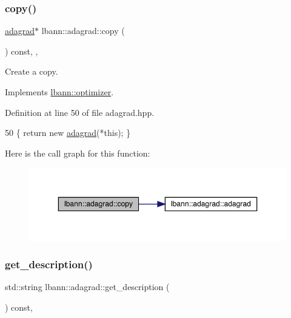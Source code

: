 \subsubsection{\texorpdfstring{copy()}{copy()}}
{\footnotesize\ttfamily \hyperlink{classlbann_1_1adagrad}{adagrad}$\ast$ lbann\+::adagrad\+::copy (\begin{DoxyParamCaption}{ }\end{DoxyParamCaption}) const\hspace{0.3cm}{\ttfamily [inline]}, {\ttfamily [override]}, {\ttfamily [virtual]}}

Create a copy. 

Implements \hyperlink{classlbann_1_1optimizer_adf19a1d19d832ebfe70072cc202cdf39}{lbann\+::optimizer}.



Definition at line 50 of file adagrad.\+hpp.


\begin{DoxyCode}
50 \{ \textcolor{keywordflow}{return} \textcolor{keyword}{new} \hyperlink{classlbann_1_1adagrad_a26d826ba89053481a26573a592ff2f8a}{adagrad}(*\textcolor{keyword}{this}); \}
\end{DoxyCode}
Here is the call graph for this function\+:\nopagebreak
\begin{figure}[H]
\begin{center}
\leavevmode
\includegraphics[width=350pt]{classlbann_1_1adagrad_a4e8a72adf65df84d15f24fe6be03d1b1_cgraph}
\end{center}
\end{figure}
\mbox{\label{classlbann_1_1adagrad_ad8c3000c84809fab63672e9eb35c5370}} 
\subsubsection{\texorpdfstring{get\+\_\+description()}{get\_description()}}
{\footnotesize\ttfamily std\+::string lbann\+::adagrad\+::get\+\_\+description (\begin{DoxyParamCaption}{ }\end{DoxyParamCaption}) const\hspace{0.3cm}{\ttfamily [override]}, {\ttfamily [virtual]}}

